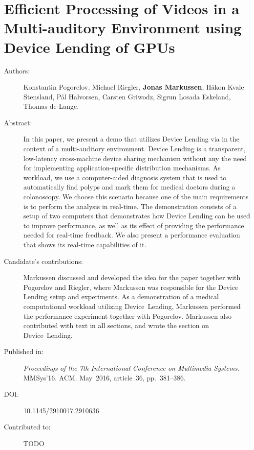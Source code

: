 \chapter{Efficient Processing of Videos in a Multi-auditory Environment using Device Lending of GPUs}
\label{paper:mmsys}
\paperthumb

\begin{description}
	\item[Authors:]
	Konstantin Pogorelov, Michael Riegler, \textbf{Jonas Markussen}, H{\aa}kon Kvale Stensland,
	P{\aa}l Halvorsen, Carsten Griwodz, Sigrun Losada Eskeland, Thomas de Lange.


	\item[Abstract:]
		In this paper, we present a demo that utilizes Device Lending 
		via  in the context of a multi-auditory
		environment. Device Lending is a transparent, low-latency
		cross-machine  device sharing mechanism without any
		the need for implementing application-specific distribution
		mechanisms. As workload, we use a computer-aided diagnosis 
		system that is used to automatically find polyps and
		mark them for medical doctors during a colonoscopy. We
		choose this scenario because one of the main requirements
		is to perform the analysis in real-time. The demonstration
		consists of a setup of two computers that demonstrates how
		Device Lending can be used to improve performance, as well
		as its effect of providing the performance needed for 
		real-time feedback. We also present a performance evaluation
		that shows its real-time capabilities of it.


	\item[Candidate's contributions:]
		Markussen discussed and developed the idea for the paper together with Pogorelov and Riegler, where Markussen was responsible for the Device Lending setup and experiments.
		As a demonstration of a medical computational workload utilizing Device~Lending,
		Markussen performed the performance experiment together with Pogorelov.
		Markussen also contributed with text in all sections, and wrote the section on Device~Lending.

	\item[Published in:]
		\emph{Proceedings of the 7th International Conference on Multimedia Systems}. 
		MMSys'16. ACM.
		May~2016, article~36, pp.~381--386.

	\item[DOI:] \href{https://doi.org/10.1145/2910017.2910636}{10.1145/2910017.2910636}

	\item[Contributed to:]
		TODO

\end{description}

